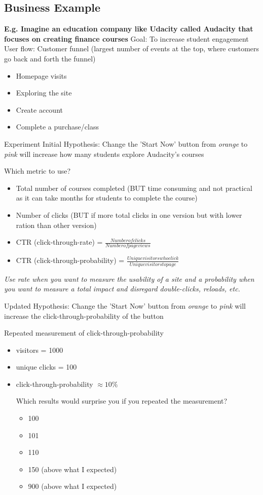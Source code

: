 \documentclass[10pt]{article}
\theoremstyle{definition}
\begin{document}
\subsection{Business Example}
\textbf{E.g. Imagine an education company like Udacity called Audacity that focuses on creating finance courses}
Goal: To increase student engagement
User flow: Customer funnel (largest number of  events at the top, where customers go back and forth the funnel)
\begin{itemize}
    \item Homepage visits
    \item Exploring the site
    \item Create account
    \item Complete a purchase/class
\end{itemize}
Experiment 
Initial Hypothesis: Change the 'Start Now' button from \textit{orange} to \textit{pink} will increase how many students explore Audacity's courses

Which metric to use?
\begin{itemize}
    \item Total number of courses completed (BUT time consuming and not practical as it can take months for students to complete the course)
    \item  Number of clicks (BUT if more total clicks in one version but with lower ration than other version) 
    \item CTR (click-through-rate) = $\frac{Number of clicks}{Number of page  views}$
    \item CTR (click-through-probability) = $\frac{Unique visitors who click}{Unique visitors to page}$
\end{itemize}

\textit{Use rate when you want to measure the usability of a site and a probability when you want to measure a total impact and disregard double-clicks, reloads, etc.}

Updated Hypothesis: Change the 'Start Now' button from \textit{orange} to \textit{pink} will increase the click-through-probability of the button

Repeated measurement of click-through-probability
\begin{itemize}
    \item visitors = 1000
    \item unique clicks = 100
    \item click-through-probability $\approx 10\%$
    
    Which results would surprise you if you repeated the measurement?
    \begin{itemize}
        \item 100
        \item 101
        \item 110
        \item 150 (above what I expected)
        \item 900 (above what I expected)
    \end{itemize}
\end{itemize}
\end{document}
